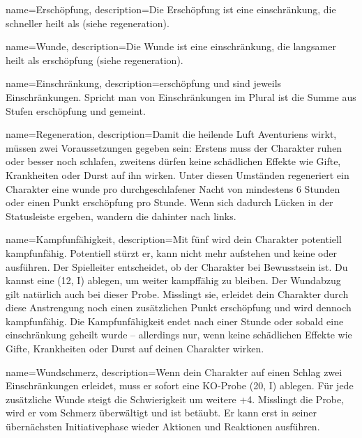 {
    name={Erschöpfung},
    description={Die Erschöpfung ist eine \gls{einschränkung}, die schneller heilt als  (siehe \gls{regeneration}).}}

{
    name={Wunde},
    description={Die Wunde ist eine \gls{einschränkung}, die langsamer heilt als \gls{erschöpfung} (siehe \gls{regeneration}).}}

{
    name={Einschränkung},
    description={\gls{erschöpfung} und  sind jeweils Einschränkungen. Spricht man von Einschränkungen im Plural ist die Summe aus Stufen \gls{erschöpfung} und  gemeint.}}

{
    name={Regeneration},
    description={Damit die heilende Luft Aventuriens wirkt, müssen zwei Vorauss­etzungen gegeben sein: Erstens muss der Charakter ruhen oder besser noch schlafen, zweitens dürfen keine schädlichen Effekte wie Gifte, Krankheiten oder Durst auf ihn wirken. Unter diesen Umständen regeneriert ein Charakter eine \gls{wunde} pro durchgeschlafener Nacht von mindestens 6 Stunden oder einen Punkt \gls{erschöpfung} pro Stunde. Wenn sich dadurch Lücken in der Statusleiste ergeben, wandern die  dahinter nach links.}}

{
    name={Kampfunfähigkeit},
    description={Mit fünf  wird dein Charakter potentiell kampfunfähig. Potentiell stürzt er, kann nicht mehr aufstehen und keine  oder  ausführen. Der Spielleiter entscheidet, ob der Charakter bei Bewusstsein ist. Du kannst eine  (12, \gls{I}) ablegen, um weiter kampffähig zu bleiben. Der Wundabzug gilt natürlich auch bei dieser Probe. Misslingt sie, erleidet dein Charakter durch diese Anstrengung noch einen zusätzlichen Punkt \gls{erschöpfung} und wird dennoch kampfunfähig. Die Kampfunfähigkeit endet nach einer Stunde oder sobald eine \gls{einschränkung} geheilt wurde – allerdings nur, wenn keine schädlichen Effekte wie Gifte, Krankheiten oder Durst auf deinen Charakter wirken.}}

{
    name={Wundschmerz},
    description={Wenn dein Charakter auf einen Schlag zwei Einschränkungen erleidet, muss er sofort eine KO-Probe (20, I) ablegen. Für jede zusätzliche Wunde steigt die Schwierigkeit um weitere +4. Misslingt die Probe, wird er vom Schmerz überwältigt und ist betäubt. Er kann erst in seiner übernächsten Initiativephase wieder Aktionen und Reaktionen ausführen.}}

